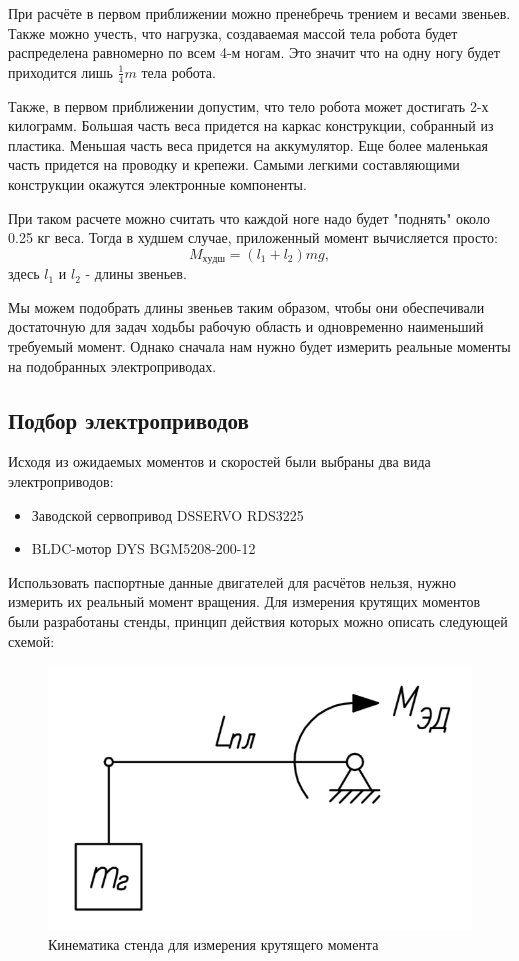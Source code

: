 При расчёте в первом приближении можно пренебречь трением и весами звеньев. Также можно учесть, что нагрузка, создаваемая массой тела робота будет распределена равномерно по всем 4-м ногам. Это значит что на одну ногу будет приходится лишь $\frac{1}{4}m$ тела робота.

Также, в первом приближении допустим, что тело робота может достигать 2-х килограмм. Большая часть веса придется на каркас конструкции, собранный из пластика. Меньшая часть веса придется на аккумулятор. Еще более маленькая часть придется на проводку и крепежи. Самыми легкими составляющими конструкции окажутся электронные компоненты.

При таком расчете можно считать что каждой ноге надо будет "поднять" около 0.25 кг веса. Тогда в худшем случае, приложенный момент вычисляется просто:
$$ M_{худш}=(l_{1}+l_{2}) m g, $$
\noindent здесь $l_1$ и $l_2$ - длины звеньев.

Мы можем подобрать длины звеньев таким образом, чтобы они обеспечивали достаточную для задач ходьбы рабочую область и одновременно наименьший требуемый момент. Однако сначала нам нужно будет измерить реальные моменты на подобранных электроприводах.

\subsection{Подбор электроприводов}

Исходя из ожидаемых моментов и скоростей были выбраны два вида электроприводов:

\begin{itemize}
    \item Заводской сервопривод DSSERVO RDS3225
    \item BLDC-мотор DYS BGM5208-200-12
\end{itemize}

Использовать паспортные данные двигателей для расчётов нельзя, нужно измерить их реальный момент вращения. Для измерения крутящих моментов были разработаны стенды, принцип действия которых можно описать следующей схемой:

\begin{figure}[ht]
    \centering
    \includegraphics[scale=0.7]{kin3.png}
    \caption{Кинематика стенда для измерения крутящего момента}
\end{figure}

